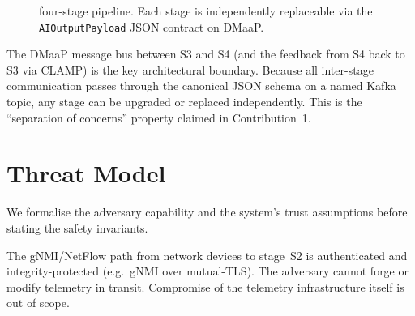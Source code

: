 \begin{figure}[H]
\centering
{}
\caption{\padonap{} four-stage pipeline. Each stage is independently
replaceable via the \texttt{AIOutputPayload} JSON contract on DMaaP.}
\label{fig:arch}
\end{figure}

The DMaaP message bus between S3 and S4 (and the feedback from S4 back
to S3 via CLAMP) is the key architectural boundary. Because all inter-stage
communication passes through the canonical JSON schema on a named Kafka
topic, any stage can be upgraded or replaced independently. This is the
``separation of concerns'' property claimed in Contribution~1.

\section{Threat Model}
\label{sec:threat-model}

We formalise the adversary capability and the system's trust assumptions
before stating the safety invariants.

\begin{assumption}
\label{asm:telemetry}
The gNMI/NetFlow path from network devices to stage~S2 is authenticated
and integrity-protected (e.g.~gNMI over mutual-TLS). The adversary cannot
forge or modify telemetry in transit. Compromise of the telemetry
infrastructure itself is out of scope.
\end{assumption}

